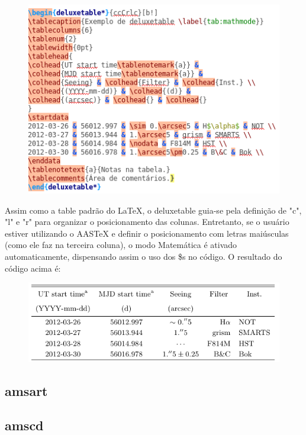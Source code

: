 \documentclass[12pt]{article}
\begin{document}
			\begin{figure}[h]
				\begin{center}
					\includegraphics[scale=0.6]{tabelaAASTEX.png}
				\end{center}
			\end{figure}
		
			Assim como a table padrão do LaTeX, o deluxetable guia-se pela definição de "c", "l" e "r" para organizar o posicionamento das colunas. Entretanto, se o usuário estiver utilizando o AASTeX e definir o posicionamento com letras maiúsculas (como ele faz na terceira coluna), o modo Matemática é ativado automaticamente, dispensando assim o uso dos \$s no código. O resultado do código acima é:
			
			\begin{figure}[h]
				\begin{center}
					\includegraphics[scale=0.4]{rtabelaAASTEX.png}
				\end{center}
			\end{figure}
			
		
		\subsection{amsart}
		
		\subsection{amscd}
		
\end{document}
